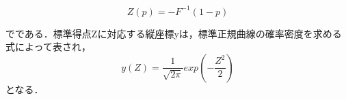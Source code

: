 \documentclass[shuuron]{kuee}
\begin{document}

\begin{equation}
  Z(p) = -F^{-1}(1-p)
\end{equation}

でである．標準得点Zに対応する縦座標yは，標準正規曲線の確率密度を求める式によって表され，
\begin{equation}
  y(Z)=\frac{1}{\sqrt{2\pi}}exp(-\frac{Z^2}{2})
\end{equation}
となる．
%
%
%
%
%


\end{document}

